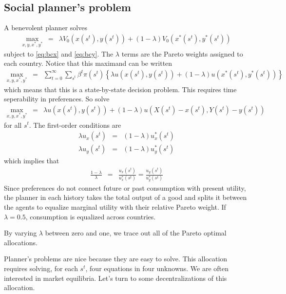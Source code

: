 \documentclass[11pt,pdftex,twoside,letterpaper]{exam}
\begin{document}
\subsection{Social planner's problem}
A benevolent planner solves
\begin{eqnarray}
  \max_{x, y, x^*, y^*} &=& \lambda V_0\left(x\left(s^t\right), y\left(s^t\right)\right) + (1-\lambda)V_0\left(x^*\left(s^t\right), y^*\left(s^t\right)\right)
\end{eqnarray}
subject to \eqref{eq:bcx} and \eqref{eq:bcy}. The $\lambda$ terms are the Pareto weights assigned to each country. Notice that this maximand can be written
\begin{eqnarray}
  \max_{x, y, x^*, y^*} &=&  \sum_{t=0}^\infty \sum_{s^t} \beta^t \pi(s^t) \left \{ \lambda u(x(s^t),y(s^t)) + (1-\lambda) u(x^*(s^t),y^*(s^t))   \right \}
\end{eqnarray}
which means that this is a state-by-state decision problem. This requires time seperability in preferences. So solve
\begin{eqnarray}
  \max_{x, y, x^*, y^*} &=&  \lambda u\left(x(s^t),y(s^t) \right) + (1-\lambda) u\left(X(s^t)-x(s^t),Y(s^t)-y(s^t)\right)
\end{eqnarray}
for all $s^t$. The first-order conditions are
\begin{eqnarray}
  \lambda u_x(s^t) &=& (1-\lambda)u_x^*(s^t)\\
  \lambda u_y(s^t) &=& (1-\lambda)u_y^*(s^t)
\end{eqnarray}
which implies that
\begin{eqnarray}
  \frac{1-\lambda}{\lambda} &=& \frac{u_x(s^t)}{u_x^*(s^t)}=\frac{u_y(s^t)}{u_y^*(s^t)} \label{eq:planners-cond}
\end{eqnarray}
Since preferences do not connect future or past consumption with present utility, the planner in each history takes the total output of a good and splits it between the agents to equalize marginal utility with their relative Pareto weight. If $\lambda=0.5$, consumption is equalized across countries.

By varying $\lambda$ between zero and one, we trace out all of the Pareto optimal allocations.

Planner's problems are nice because they are easy to solve. This allocation requires solving, for each $s^t$, four equations in four unknowns.  We are often interested in market equilibria. Let's turn to some decentralizations of this allocation.
\end{document}
